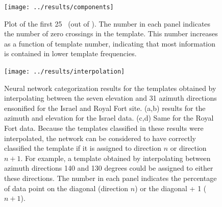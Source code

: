 \documentclass[preprint,5p]{elsarticle}
\begin{document}
\begin{figure}[h]
	\centering
	\texttt{[image: ../results/components]}
	\caption{Plot of the first 25 \pcs\ (out of \pca). The number in each panel indicates the number of zero crossings in the template. This number increases as a function of template number, indicating that most information is contained in lower template frequencies.}
	\label{fig:components}
\end{figure}

\begin{figure}[h]
	\centering
	\texttt{[image: ../results/interpolation]}
	\caption{Neural network categorization results for the templates obtained by interpolating between the seven elevation and 31 azimuth directions ensonified for the Israel and Royal Fort site. (a,b) results for the azimuth and elevation for the Israel data. (c,d) Same for the Royal Fort data. Because the templates classified in these results were interpolated, the network can be considered to have correctly classified the template if it is assigned to direction $n$ or direction $n+1$. For example, a template obtained by interpolating between azimuth directions 140 and 130 degrees could be assigned to either these directions. The number in each panel indicates the percentage of data point on the diagonal (direction $n$) or the diagonal + 1 ($n+1$).}
	\label{fig:interpolation}
\end{figure}
\end{document}
